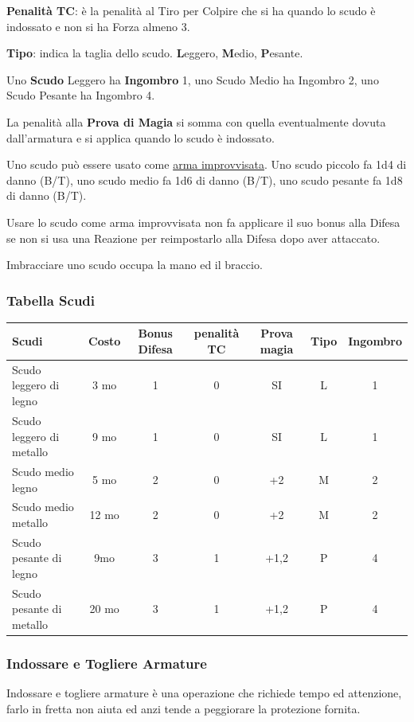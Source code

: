 \begin{multicols}{2}
\textbf{Penalità TC}: è la penalità al Tiro per Colpire che si ha quando lo scudo è indossato e non si ha Forza almeno 3.

\textbf{Tipo}: indica la taglia dello scudo. \textbf{L}eggero, \textbf{M}edio, \textbf{P}esante.

Uno \textbf{Scudo} Leggero ha \textbf{Ingombro} 1, uno Scudo Medio ha Ingombro 2, uno Scudo Pesante ha Ingombro 4.

La penalità alla \textbf{Prova di Magia} si somma con quella eventualmente dovuta dall'armatura e si applica quando lo scudo è indossato.

Uno scudo può essere usato come \hyperlink{armaimprovvisata}{arma improvvisata}. Uno scudo piccolo fa 1d4 di danno (B/T), uno scudo medio fa 1d6 di danno (B/T), uno scudo pesante fa 1d8 di danno (B/T).

Usare lo scudo come arma improvvisata non fa applicare il suo bonus alla Difesa se non si usa una Reazione per reimpostarlo alla Difesa dopo aver attaccato.

Imbracciare uno scudo occupa la mano ed il braccio.

\end{multicols}

\subsubsection{Tabella Scudi}

\label{tabella-scudi}

\noindent\begin{tabular}{lcccccc}
\textbf{Scudi} & \textbf{Costo} & \textbf{Bonus Difesa} & \textbf{penalità TC} & \textbf{Prova magia} & \textbf{Tipo} & \textbf{Ingombro}\\
\toprule
Scudo leggero di legno& 3 mo&1& 0& SI& L & 1\\
Scudo leggero di metallo & 9 mo&1& 0& SI& L& 1\\
Scudo medio legno &5 mo &2& 0& +2& M& 2\\
Scudo medio metallo&12 mo&2& 0& +2& M& 2\\
Scudo pesante di legno & 9mo&3 & 1& +1,2& P& 4\\
Scudo pesante di metallo & 20 mo&3& 1& +1,2& P& 4\\
\end{tabular}

\begin{multicols}{2}

\subsubsection{Indossare e Togliere Armature}

Indossare e togliere armature è una operazione che richiede tempo ed attenzione, farlo in fretta non aiuta ed anzi tende a peggiorare la protezione fornita.

\end{multicols}

